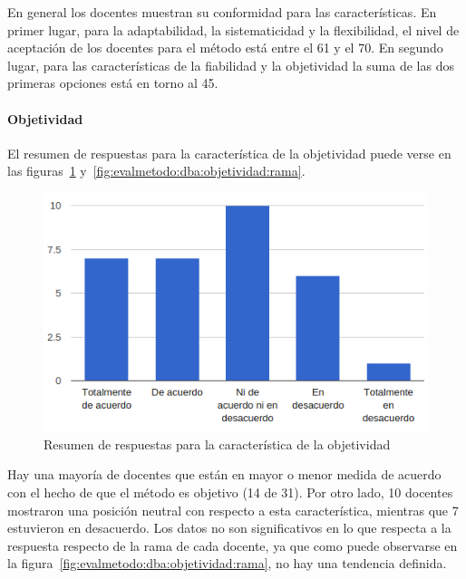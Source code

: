 En general los docentes muestran su conformidad para las características. En primer lugar, para la adaptabilidad, la sistematicidad y la flexibilidad, el nivel de aceptación de los docentes para el método está entre el 61 y el 70\percentage. En segundo lugar, para las características de la fiabilidad y la objetividad la suma de las dos primeras opciones está en torno al 45\percentage.

\newpage
\paragraph*{Objetividad}

El resumen de respuestas para la característica de la objetividad puede verse en las figuras~\ref{fig:evalmetodo:dba:objetividad} y~\ref{fig:evalmetodo:dba:objetividad:rama}.

\begin{figure}[h]
  \begin{center}
    \includegraphics[scale=0.45]{C_DBA_objetividad.png}
  \end{center}
  \caption{Resumen de respuestas para la característica de la objetividad}
  \label{fig:evalmetodo:dba:objetividad}
\end{figure}

Hay una mayoría de docentes que están en mayor o menor medida de acuerdo con el hecho de que el método es objetivo (14 de 31). Por otro lado, 10 docentes mostraron una posición neutral con respecto a esta característica, mientras que 7 estuvieron en desacuerdo. Los datos no son significativos en lo que respecta a la respuesta respecto de la rama de cada docente, ya que como puede observarse en la figura~\ref{fig:evalmetodo:dba:objetividad:rama}, no hay una tendencia definida.

